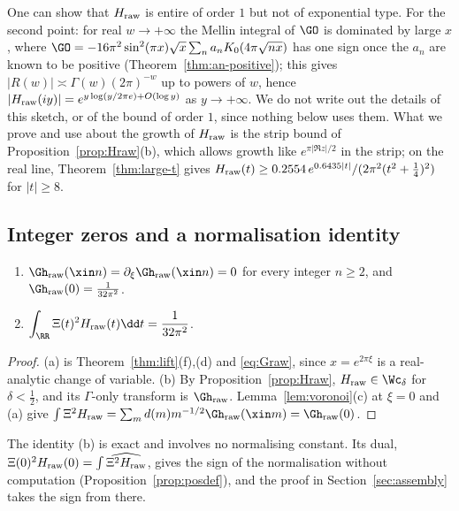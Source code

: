 \begin{remark}\label{rem:infinite-type}
One can show that $H_{\rm raw}$ is entire of order $1$ but not of exponential type. For the second point: for real $w\to+\infty$ the Mellin
integral of $\GO$ is dominated by
large $x$, where $\GO=-16\pi^2\sin^2(\pi x)\sqrt x\sum_na_nK_0(4\pi\sqrt{nx})$ has one sign once the $a_n$ are known to be positive
(Theorem~\ref{thm:an-positive}); this gives $|R(w)|\asymp\Gamma(w)(2\pi)^{-w}$ up to powers of $w$, hence
$|H_{\rm raw}(iy)|=e^{y\log(y/2\pi e)+O(\log y)}$ as $y\to+\infty$. We do not write out the details of this sketch, or of the bound of order
$1$, since nothing below uses them. What we prove
and use about the growth of $H_{\rm raw}$ is the strip bound of Proposition~\ref{prop:Hraw}(b), which allows growth like $e^{\pi|\Re z|/2}$
in the strip; on the real line, Theorem~\ref{thm:large-t} gives $H_{\rm raw}(t)\ge0.2554\,e^{0.6435|t|}/(2\pi^2(t^2+\frac14)^2)$ for $|t|\ge8$.
\end{remark}

\subsection{Integer zeros and a normalisation identity}

\begin{proposition}\label{prop:C3}
\begin{enumerate}[label=\textup{(\alph*)}]
\item $\Gh_{\rm raw}(\xin n)=\partial_\xi\Gh_{\rm raw}(\xin n)=0$ for every integer $n\ge2$, and $\Gh_{\rm raw}(0)=\frac1{32\pi^2}$.
\item $\displaystyle\int_\RR\Xi(t)^2H_{\rm raw}(t)\dd t=\frac1{32\pi^2}$.
\end{enumerate}
\end{proposition}

\begin{proof}
(a) is Theorem~\ref{thm:lift}(f),(d) and \eqref{eq:Graw}, since $x=e^{2\pi\xi}$ is a real-analytic change of variable. (b) By
Proposition~\ref{prop:Hraw}, $H_{\rm raw}\in\Wc_\delta$ for $\delta<\frac12$, and its $\Gamma$-only transform is $\Gh_{\rm raw}$. Lemma~\ref{lem:voronoi}(c) at
$\xi=0$ and (a) give $\int\Xi^2H_{\rm raw}=\sum_md(m)m^{-1/2}\Gh_{\rm raw}(\xin m)=\Gh_{\rm raw}(0)$.
\end{proof}

The identity (b) is exact and involves no normalising constant. Its dual, $\Xi(0)^2H_{\rm raw}(0)=\int\widehat{\Xi^2H_{\rm raw}}$, gives the sign of
the normalisation without computation (Proposition~\ref{prop:posdef}), and the proof in Section~\ref{sec:assembly} takes the sign from there.
